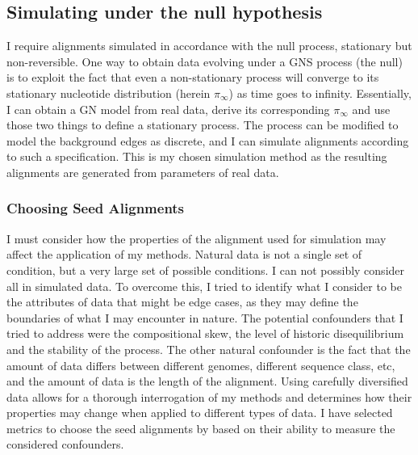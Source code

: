 \subsection{Simulating under the null hypothesis}

I require alignments simulated in accordance with the null process, stationary but non-reversible. One way to obtain data evolving under a GNS process (the null) is to exploit the fact that even a non-stationary process will converge to its stationary nucleotide distribution (herein $\pi_{\infty}$) as time goes to infinity. Essentially, I can obtain a GN model from real data, derive its corresponding $\pi_{\infty}$ and use those two things to define a stationary process. The process can be modified to model the background edges as discrete, and I can simulate alignments according to such a specification. This is my chosen simulation method as the resulting alignments are generated from parameters of real data. 

\subsubsection{Choosing Seed Alignments}

I must consider how the properties of the alignment used for simulation may affect the application of my methods. Natural data is not a single set of condition, but a very large set of possible conditions. I can not possibly consider all in simulated data. To overcome this, I tried to identify what I consider to be the attributes of data that might be edge cases, as they may define the boundaries of what I may encounter in nature. The potential confounders that I tried to address were the compositional skew, the level of historic disequilibrium and the stability of the process. The other natural confounder is the fact that the amount of data differs between different genomes, different sequence class, etc, and the amount of data is the length of the alignment. Using carefully diversified data allows for a thorough interrogation of my methods and determines how their properties may change when applied to different types of data. I have selected metrics to choose the seed alignments by based on their ability to measure the considered confounders. 

